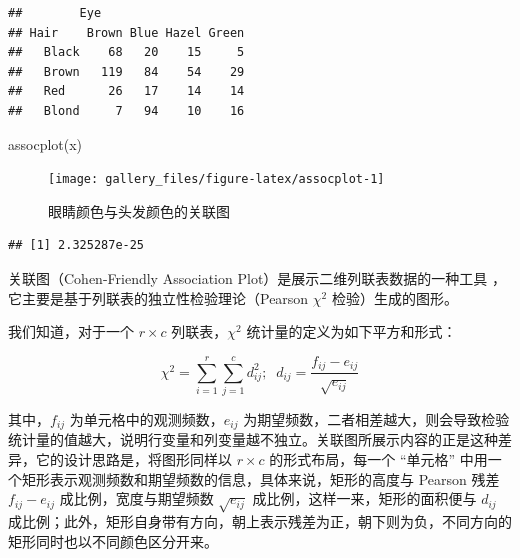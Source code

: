 \documentclass[
  b5paper,
  UTF8,twoside]{book}
\newenvironment{Shaded}{\begin{snugshade}}{\end{snugshade}}
\newcommand{\CommentTok}[1]{\textcolor[rgb]{0.56,0.35,0.01}{\textit{#1}}}
\newcommand{\FunctionTok}[1]{\textcolor[rgb]{0.00,0.00,0.00}{#1}}
\newcommand{\NormalTok}[1]{#1}
\newcommand{\SpecialCharTok}[1]{\textcolor[rgb]{0.00,0.00,0.00}{#1}}
\begin{document}
\begin{verbatim}
##        Eye
## Hair    Brown Blue Hazel Green
##   Black    68   20    15     5
##   Brown   119   84    54    29
##   Red      26   17    14    14
##   Blond     7   94    10    16
\end{verbatim}

\begin{Shaded}
\begin{Highlighting}[]
\FunctionTok{assocplot}\NormalTok{(x)}
\end{Highlighting}
\end{Shaded}

\begin{figure}

{\centering \texttt{[image: gallery\_files/figure-latex/assocplot-1]} 

}

\caption[眼睛颜色与头发颜色的关联图]{眼睛颜色与头发颜色的关联图}\label{fig:assocplot}
\end{figure}

\begin{Shaded}
\end{Shaded}

\begin{verbatim}
## [1] 2.325287e-25
\end{verbatim}

关联图（Cohen-Friendly Association
Plot）是展示二维列联表数据的一种工具 \citep{Cohen80, Friendly92}，它主要是基于列联表的独立性检验理论（Pearson
\(\chi^{2}\) 检验）生成的图形。

我们知道，对于一个 \(r\times c\) 列联表，\(\chi^{2}\) 统计量的定义为如下平方和形式：

\begin{equation} 
\chi^{2}=\sum_{i=1}^{r}\sum_{j=1}^{c}d_{ij}^{2};\;\; d_{ij}=\frac{f_{ij}-e_{ij}}{\sqrt{e_{ij}}}
\label{eq:cap}
\end{equation}

其中，\(f_{ij}\) 为单元格中的观测频数，\(e_{ij}\) 为期望频数，二者相差越大，则会导致检验统计量的值越大，说明行变量和列变量越不独立。关联图所展示内容的正是这种差异，它的设计思路是，将图形同样以 \(r\times c\) 的形式布局，每一个 ``单元格'' 中用一个矩形表示观测频数和期望频数的信息，具体来说，矩形的高度与 Pearson 残差 \(f_{ij}-e_{ij}\) 成比例，宽度与期望频数 \(\sqrt{e_{ij}}\) 成比例，这样一来，矩形的面积便与 \(d_{ij}\) 成比例；此外，矩形自身带有方向，朝上表示残差为正，朝下则为负，不同方向的矩形同时也以不同颜色区分开来。
\end{document}
